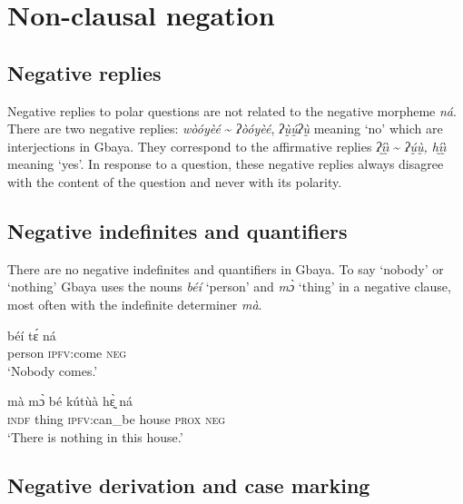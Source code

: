 \documentclass[output=paper,colorlinks=true, citecolor=brown]{langscibook}
\begin{document}
\section{Non-clausal negation}\label{sec:gba:3}

\subsection{Negative replies}\label{sec:gba:3.1}

Negative replies to polar questions are not related to the negative morpheme \textit{ná}. There are two negative replies: \textit{wòóyèé} {\textasciitilde} \textit{ʔòóyèé}, \textit{ʔṵ̀ṵ́ʔṵ̀} meaning ‘no’ which are interjections in Gbaya. They correspond to the affirmative replies \textit{ʔı̰́ı̰̀ } {\textasciitilde} \textit{ʔṵ́ṵ̀, h\'{ı̰}\`{ı̰}   }meaning ‘yes’. In response to a question, these negative replies always disagree with the content of the question and never with its polarity.

\subsection{Negative indefinites and quantifiers}\label{sec:gba:3.2}

There are no negative indefinites and quantifiers in Gbaya. To say ‘nobody’  or ‘nothing’  Gbaya uses the nouns \textit{béí} ‘person’ and \textit{mɔ̀} ‘thing’ in a negative clause, most often with the indefinite determiner \textit{mà}.


\ea\label{ex:gba:69}
    \gll béí tɛ́ ná \\ 
         person \textsc{ipfv}:come \textsc{neg} \\
    \glt ‘Nobody comes.’
\z 
 
\ea\label{ex:gba:70}
    \gll mà mɔ̀ bé kútùà hɛ̰̀ ná \\ 
         \textsc{indf} thing \textsc{ipfv}:can\_be house \textsc{prox} \textsc{neg} \\
    \glt ‘There is nothing in this house.’
\z 

\subsection{Negative derivation and case marking}\label{sec:gba:3.3}
\end{document}
